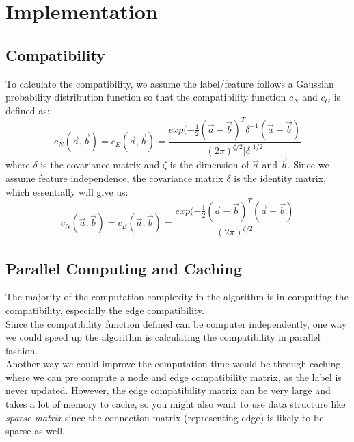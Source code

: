 \section{Implementation}

\subsection{Compatibility}

To calculate the compatibility, we assume the label/feature follows a Gaussian probability distribution function so that the compatibility function $c_N$ and $c_G$ is defined as:
\begin{equation} 
c_N( \overrightarrow{a}, \overrightarrow{b} )=c_E( \overrightarrow{a}, \overrightarrow{b})=\frac{exp(-\frac{1}{2}(\overrightarrow{a}-\overrightarrow{b})^{T}\delta^{-1}(\overrightarrow{a}-\overrightarrow{b})}{(2\pi)^{\zeta/2}|\delta|^{1/2}}
\end{equation}
where $\delta$ is the covariance matrix and $\zeta$ is the dimension of $\overrightarrow{a}$ and $\overrightarrow{b}$. Since we assume feature independence, the covariance matrix $\delta$ is the identity matrix, which essentially will give us:
\begin{equation} 
c_N( \overrightarrow{a}, \overrightarrow{b} )=c_E( \overrightarrow{a}, \overrightarrow{b})=\frac{exp(-\frac{1}{2}(\overrightarrow{a}-\overrightarrow{b})^{T}(\overrightarrow{a}-\overrightarrow{b})}{(2\pi)^{\zeta/2}}
\end{equation}

\subsection{Parallel Computing and Caching}

The majority of the computation complexity in the algorithm is in computing the compatibility, especially the edge compatibility.\\

Since the compatibility function defined can be computer independently, one way we could speed up the algorithm is calculating the compatibility in parallel fashion.\\

Another way we could improve the computation time would be through caching, where we can pre compute a node and edge compatibility matrix, as the label is never updated. However, the edge compatibility matrix can be very large and takes a lot of memory to cache, so you might also want to use data structure like \emph{sparse matrix} since the connection matrix (representing edge) is likely to be sparse as well.

